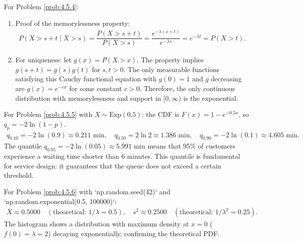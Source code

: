 \begin{solucion}
	\label{sol:4.5.4}
	For Problem \ref{prob:4.5.4}:
	\begin{enumerate}
		\item Proof of the memorylessness property:
		\begin{align*}
			P(X > s + t \mid X > s) = \dfrac{P(X > s + t)}{P(X > s)} = \dfrac{e^{-\lambda(s+t)}}{e^{-\lambda s}} = e^{-\lambda t} = P(X > t).
		\end{align*}
		\item For uniqueness: let $g(x) = P(X > x)$. The property implies $g(s + t) = g(s) g(t)$ for $s, t > 0$. The only measurable functions satisfying this Cauchy functional equation with $g(0) = 1$ and $g$ decreasing are $g(x) = e^{-cx}$ for some constant $c > 0$. Therefore, the only continuous distribution with memorylessness and support in $[0, \infty)$ is the exponential. \quad \qedhere
	\end{enumerate}
\end{solucion}

\begin{solucion}
	\label{sol:4.5.5}
	For Problem \ref{prob:4.5.5} with $X \sim \text{Exp}(0.5)$: the CDF is $F(x) = 1 - e^{-0.5 x}$, so $q_{p} = -2\ln(1-p)$.
	\begin{align*}
		q_{0.10} = -2\ln(0.9) \approx 0.211 \text{ min}, \quad q_{0.50} = 2\ln 2 \approx 1.386 \text{ min}, \quad q_{0.90} = -2\ln(0.1) \approx 4.605 \text{ min}.
	\end{align*}
	The quantile $q_{0.95} = -2\ln(0.05) \approx 5.991$ min means that 95\% of customers experience a waiting time shorter than 6 minutes. This quantile is fundamental for service design: it guarantees that the queue does not exceed a certain threshold.
\end{solucion}

\begin{solucion}
	\label{sol:4.5.6}
	For Problem \ref{prob:4.5.6} with `np.random.seed(42)` and `np.random.exponential(0.5, 100000)`:
	\begin{align*}
		\bar{X} \approx 0.5000 \quad (\text{theoretical: } 1/\lambda = 0.5), \quad s^{2} \approx 0.2500 \quad (\text{theoretical: } 1/\lambda^{2} = 0.25).
	\end{align*}
	The histogram shows a distribution with maximum density at $x = 0$ ($f(0) = \lambda = 2$) decaying exponentially, confirming the theoretical PDF.
\end{solucion}

